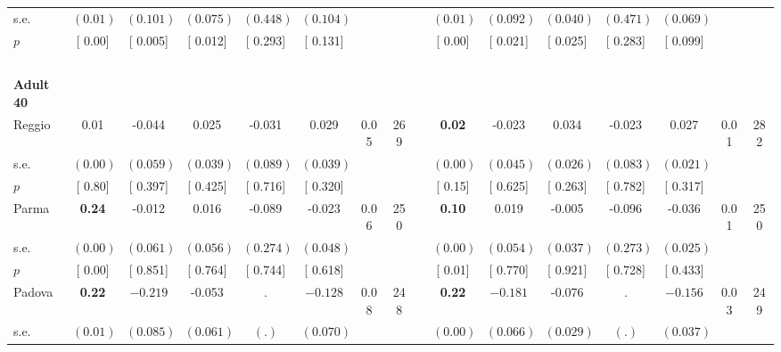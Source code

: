 \begin{longtable}{L{8em} c c c c c c c p{1em} c c c c c c c}
\quad \quad \quad \quad s.e.& $ (     0.01)$ & $ (    0.101)$ & $ (    0.075)$ & $ (    0.448)$ & $ (    0.104)$ & & & & $ (     0.01)$ & $ (    0.092)$ & $ (    0.040)$ & $ (    0.471)$ & $ (    0.069)$ & &  \\*
\quad \quad \quad \quad $ p$ & [     0.00] & [    0.005] & [    0.012] & [    0.293] & [    0.131] & & & & [     0.00] & [    0.021] & [    0.025] & [    0.283] & [    0.099] & &  \\[1em]
~\\[1em]
\quad \quad \textbf{Adult 40} & & & & & & & & & & & & & & & \\* 
\quad \quad \quad Reggio& 0.01 &    -0.044 &     0.025 &    -0.031 &     0.029 &      0.05 &       269 & & \textbf{     0.02} &    -0.023 &     0.034 &    -0.023 &     0.027 &      0.01 &       282  \\*
\quad \quad \quad \quad s.e.& $ (     0.00)$ & $ (    0.059)$ & $ (    0.039)$ & $ (    0.089)$ & $ (    0.039)$ & & & & $ (     0.00)$ & $ (    0.045)$ & $ (    0.026)$ & $ (    0.083)$ & $ (    0.021)$ & &  \\*
\quad \quad \quad \quad $ p$ & [     0.80] & [    0.397] & [    0.425] & [    0.716] & [    0.320] & & & & [     0.15] & [    0.625] & [    0.263] & [    0.782] & [    0.317] & &  \\[1em]
\quad \quad \quad Parma& \textbf{     0.24} &    -0.012 &     0.016 &    -0.089 &    -0.023 &      0.06 &       250 & & \textbf{     0.10} &     0.019 &    -0.005 &    -0.096 &    -0.036 &      0.01 &       250  \\*
\quad \quad \quad \quad s.e.& $ (     0.00)$ & $ (    0.061)$ & $ (    0.056)$ & $ (    0.274)$ & $ (    0.048)$ & & & & $ (     0.00)$ & $ (    0.054)$ & $ (    0.037)$ & $ (    0.273)$ & $ (    0.025)$ & &  \\*
\quad \quad \quad \quad $ p$ & [     0.00] & [    0.851] & [    0.764] & [    0.744] & [    0.618] & & & & [     0.01] & [    0.770] & [    0.921] & [    0.728] & [    0.433] & &  \\[1em]
\quad \quad \quad Padova& \textbf{     0.22} & $ \mathbf{   -0.219}$ &    -0.053 &         . & $ \mathbf{   -0.128}$ &      0.08 &       248 & & \textbf{     0.22} & $ \mathbf{   -0.181}$ &    -0.076 &         . & $ \mathbf{   -0.156}$ &      0.03 &       249  \\*
\quad \quad \quad \quad s.e.& $ (     0.01)$ & $ (    0.085)$ & $ (    0.061)$ & $ (        .)$ & $ (    0.070)$ & & & & $ (     0.00)$ & $ (    0.066)$ & $ (    0.029)$ & $ (        .)$ & $ (    0.037)$ & &  \\*

\end{longtable}
